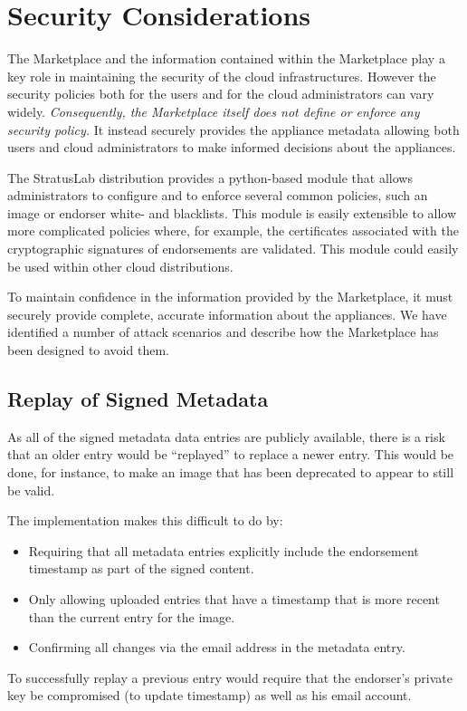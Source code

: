\section{Security Considerations}
\label{sec:security}

The Marketplace and the information contained within the Marketplace
play a key role in maintaining the security of the cloud
infrastructures.  However the security policies both for the users and
for the cloud administrators can vary widely.  {\em Consequently, the
  Marketplace itself does not define or enforce any security policy.}
It instead securely provides the appliance metadata allowing both
users and cloud administrators to make informed decisions about the
appliances.

The StratusLab distribution provides a python-based module that allows
administrators to configure and to enforce several common policies,
such an image or endorser white- and blacklists.  This module is
easily extensible to allow more complicated policies where, for
example, the certificates associated with the cryptographic signatures
of endorsements are validated.  This module could easily be used
within other cloud distributions.

To maintain confidence in the information provided by the Marketplace,
it must securely provide complete, accurate information about the
appliances.  We have identified a number of attack scenarios and
describe how the Marketplace has been designed to avoid them. 

\subsection{Replay of Signed Metadata}

As all of the signed metadata data entries are publicly available,
there is a risk that an older entry would be ``replayed'' to replace a
newer entry.  This would be done, for instance, to make an image that
has been deprecated to appear to still be valid.

The implementation makes this difficult to do by:
\begin{itemize}
\item Requiring that all metadata entries explicitly include the
  endorsement timestamp as part of the signed content.
\item Only allowing uploaded entries that have a timestamp that is 
  more recent than the current entry for the image.
\item Confirming all changes via the email address in the metadata
  entry.
\end{itemize}
To successfully replay a previous entry would require that the
endorser's private key be compromised (to update timestamp) as well as
his email account.


